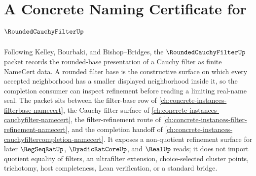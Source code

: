 \chapter{A Concrete Naming Certificate for $\RoundedCauchyFilterUp$}
\label{ch:concrete-instances-rounded-cauchy-filter-namecert}

Following Kelley, Bourbaki, and Bishop--Bridges, the $\RoundedCauchyFilterUp$ packet records the rounded-base presentation of a Cauchy filter as finite NameCert data. A rounded filter base is the constructive surface on which every accepted neighborhood has a smaller displayed neighborhood inside it, so the completion consumer can inspect refinement before reading a limiting real-name seal. The packet sits between the filter-base row of \autoref{ch:concrete-instances-filterbase-namecert}, the Cauchy-filter surface of \autoref{ch:concrete-instances-cauchyfilter-namecert}, the filter-refinement route of \autoref{ch:concrete-instances-filter-refinement-namecert}, and the completion handoff of \autoref{ch:concrete-instances-cauchyfiltercompletion-namecert}. It exposes a non-quotient refinement surface for later $\RegSeqRatUp$, $\DyadicRatCoreUp$, and $\RealUp$ reads; it does not import quotient equality of filters, an ultrafilter extension, choice-selected cluster points, trichotomy, host completeness, Lean verification, or a standard bridge.

